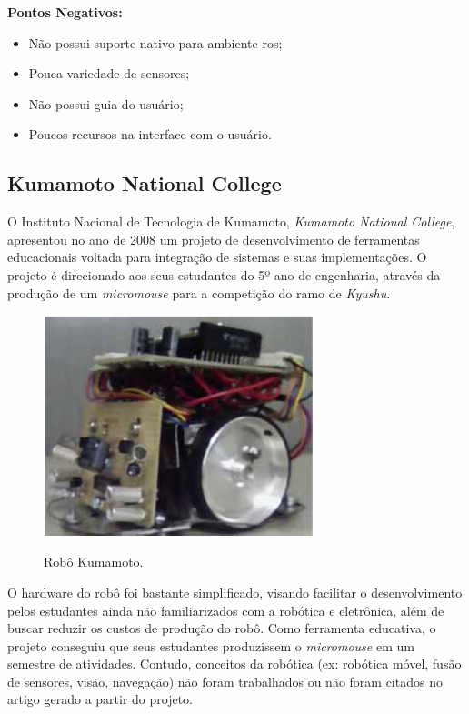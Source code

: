 \textbf{Pontos Negativos:}
\begin{itemize}
	\item Não possui suporte nativo para ambiente \gls*{ros};
	\item Pouca variedade de sensores;
	\item Não possui guia do usuário;
	\item Poucos recursos na interface com o usuário.
\end{itemize}


\subsection{Kumamoto National College}
\hspace{0.5cm} O Instituto Nacional de Tecnologia de Kumamoto, \textit{Kumamoto National College}, apresentou no ano de 2008 um projeto de desenvolvimento de ferramentas educacionais voltada para integração de sistemas e suas implementações. O projeto é direcionado aos seus estudantes do 5º ano de engenharia, através da produção de um \textit{micromouse} para a competição do ramo de \textit{Kyushu}.

\begin{figure}[H]
	\centering
	\caption{Robô Kumamoto.}
	\includegraphics[width=0.7\textwidth]
	{Figures/Kumamoto_model.png}
	\label{fig:Kumamoto_model}
\end{figure}

\hspace{0.5cm} O hardware do robô foi bastante simplificado, visando facilitar o desenvolvimento pelos estudantes ainda não familiarizados com a robótica e eletrônica, além de buscar reduzir os custos de produção do robô. Como ferramenta educativa, o projeto conseguiu que seus estudantes produzissem o \textit{micromouse} em um semestre de atividades. Contudo, conceitos da robótica (ex: robótica móvel, fusão de sensores, visão, navegação) não foram trabalhados ou não foram citados no artigo gerado a partir do projeto.


